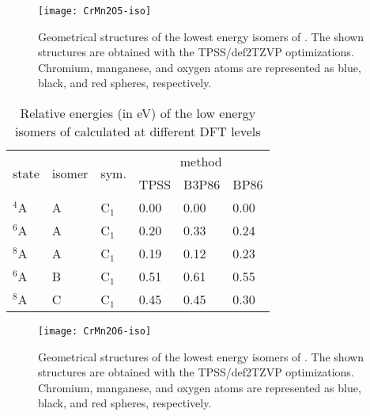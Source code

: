 \begin{figure}
	\centering
	\texttt{[image: CrMn2O5-iso]}
	\caption{Geometrical structures of the lowest energy isomers of . The shown structures are obtained with the TPSS/def2TZVP optimizations. Chromium, manganese, and oxygen atoms are represented as blue, black, and red spheres, respectively.}
	\label{figs:CrMn2O5}
\end{figure}








\begin{table}[]
	\centering
	\caption{Relative energies (in eV) of the low energy isomers of  calculated at different DFT levels}
\begin{tabular}{@{}llllll@{}}
\toprule
\multirow{2}{*}{state} & \multirow{2}{*}{isomer} & \multirow{2}{*}{sym.} & \multicolumn{3}{c}{method} \\ \cmidrule(l){4-6} 
           &        &         & TPSS   & B3P86 & BP86   \\ \midrule
$^4$A    & A      & C$_1$   & 0.00   & 0.00  & 0.00 \\
$^6$A    & A      & C$_1$   & 0.20   & 0.33  & 0.24 \\
$^8$A    & A      & C$_1$   & 0.19   & 0.12  & 0.23 \\
$^6$A    & B      & C$_1$   & 0.51   & 0.61  & 0.55 \\
$^8$A    & C      & C$_1$   & 0.45   & 0.45  & 0.30 \\ \bottomrule
\end{tabular}
\label{tbl:CrMn2O6}
\end{table}	


\begin{figure}
	\centering
	\texttt{[image: CrMn2O6-iso]}
	\caption{Geometrical structures of the lowest energy isomers of . The shown structures are obtained with the TPSS/def2TZVP optimizations. Chromium, manganese, and oxygen atoms are represented as blue, black, and red spheres, respectively.}
	\label{figs:CrMn2O6}
\end{figure}






